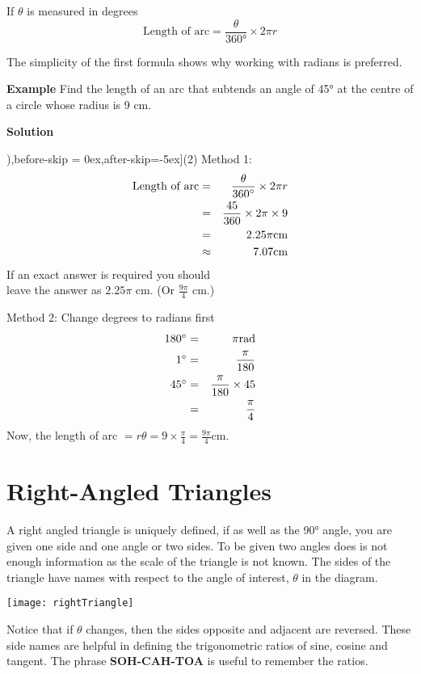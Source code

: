 If $\theta $ is measured in degrees
\begin{equation*}\text{Length of arc} =\frac{\theta }{\ang{360}} \times 2 \pi  r
\end{equation*}

The simplicity of the first formula shows why working with radians is preferred. 

\textbf{Example} Find the length of an arc that subtends an angle of \ang{45} at the centre of a circle whose radius is 9 cm. 

\textbf{Solution} \begin{tasks}[counter-format=(tsk[1]),before-skip = {0ex},after-skip={-5ex}](2)
	\task Method 1:\begin{eqnarray*}\text{Length of arc} &  = & \frac{\theta }{360 \mbox{{\ensuremath{{}^\circ}}}} \times 2 \pi  r \\
	&  = & \frac{45}{360} \times 2 \pi  \times 9 \\
	&  = & 2.25 \pi \text{}\mbox{cm} \\
	&  \approx  & 7.07\text{}\mbox{cm}\end{eqnarray*}
If an exact answer is required you should\\ leave the answer as $2.25 \pi $ $\mbox{cm}$. (Or $\frac{9 \pi }{4}$ $\mbox{cm}\text{.}$) 

\task Method 2: Change degrees to radians first
\begin{eqnarray*}180 \mbox{{\ensuremath{{}^\circ}}} &  = & \pi \text{}\mbox{rad} \\
	1 \mbox{{\ensuremath{{}^\circ}}} &  = & \frac{\pi }{180} \\
	45 \mbox{{\ensuremath{{}^\circ}}} &  = & \frac{\pi }{180} \times 45 \\
	&  = & \frac{\pi }{4}\end{eqnarray*}
Now, the length of arc $= r \theta = 9 \times \frac{\pi }{4} =\frac{9 \pi }{4}\text{}\mbox{cm}$.
\end{tasks}
\section{Right-Angled Triangles}
A right angled triangle is uniquely defined, if as well as the \ang{90} angle, you are given one side and one angle or two sides. To be given two angles does is not enough information as the scale of the triangle is not known. The sides of the triangle have names with respect to the angle of interest, $\theta$ in the diagram. 
\begin{multicols}{2}
\begin{center}
	\texttt{[image: rightTriangle]}
\end{center}
\columnbreak
Notice that if $\theta$ changes, then the sides opposite and adjacent are reversed. These side names are helpful in defining the trigonometric ratios of sine, cosine and tangent. The phrase \textbf{SOH-CAH-TOA} is useful to remember the ratios.
\end{multicols}



